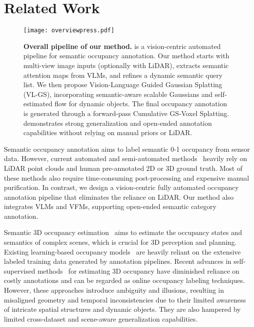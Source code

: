 \section{Related Work}
\label{sec:formatting}

\begin{figure*}[htbp]
  \centering
  \texttt{[image: overviewpress.pdf]}
  \caption{\textbf{Overall pipeline of our method.} \ourmethod{} is a vision-centric automated pipeline for semantic occupancy annotation. Our method starts with multi-view image inputs (optionally with LiDAR), extracts semantic attention maps from VLMs, and refines a dynamic semantic query list. We then propose Vision-Language Guided Gaussian Splatting (VL-GS), incorporating semantic-aware scalable Gaussians and self-estimated flow for dynamic objects. The final occupancy annotation is generated through a forward-pass Cumulative GS-Voxel Splatting. \ourmethod{} demonstrates strong generalization and open-ended annotation capabilities without relying on manual priors or LiDAR.
  }
  \label{fig:overview}
  \afterfig
\end{figure*}

%
Semantic occupancy annotation aims to label semantic 0-1 occupancy from sensor data. However, current automated and semi-automated methods~\cite{wei2023surroundocc, Wang_2023_ICCV, tong2023scene} heavily rely on LiDAR point clouds and human pre-annotated 2D or 3D ground truth. Most of these methods also require time-consuming post-processing and expensive manual purification. In contrast, we design a vision-centric fully automated occupancy annotation pipeline that eliminates the reliance on LiDAR. Our method also integrates VLMs and VFMs, supporting open-ended semantic category annotation.

Semantic 3D occupancy estimation~\cite{tian2024occ3d, zhang2023occformer, Wang_2023_ICCV} aims to estimate the occupancy states and semantics of complex scenes, which is crucial for 3D perception and planning.
%
Existing learning-based occupancy models~\cite{li2022bevformer, shi2024occupancy, zhang2023occformer, huang2023tri, li2023fb, pan2023uniocc, yu2023flashocc} are heavily reliant on the extensive labeled training data generated by annotation pipelines.
%
Recent advances in self-supervised methods~\cite{huang2024selfocc, zhang2023occnerf, boeder2024occflownet, wan2024gaussianocc, boeder2024langocc} for estimating 3D occupancy have diminished reliance on costly annotations and can be regarded as online occupancy labeling techniques.
%
However, these approaches introduce ambiguity and illusions, resulting in misaligned geometry and temporal inconsistencies due to their limited awareness of intricate spatial structures and dynamic objects. They are also hampered by limited cross-dataset and scene-aware generalization capabilities.

